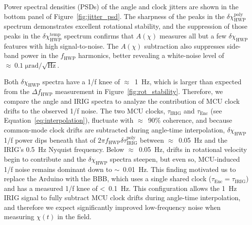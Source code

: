 Power spectral densities (PSDs) of the angle and clock jitters are shown in the bottom panel of Figure~\ref{fig:jitter_psd}. The sharpness of the peaks in the $\delta \chi_{\mathrm{HWP}}^{\mathrm{poly}}$ spectrum demonstrates excellent rotational stability, and the suppression of those peaks in the $\delta \chi_{\mathrm{HWP}}^{\mathrm{temp}}$ spectrum confirms that $A(\chi)$ measures all but a few $\delta \chi_{\mathrm{HWP}}$ features with high signal-to-noise. The $A(\chi)$ subtraction also suppresses side-band power in the $f_{\mathrm{HWP}}$ harmonics, better revealing a white-noise level of $\approx \: 0.1 \; \mathrm{\mu rad / \sqrt{Hz}}$.

Both $\delta \chi_{\mathrm{HWP}}$ spectra have a 1/f knee of $\approx$~1~Hz, which is larger than expected from the $\Delta f_{\mathrm{HWP}}$ measurement in Figure~\ref{fig:rot_stability}. Therefore, we compare the angle and IRIG spectra to analyze the contribution of MCU clock drifts to the observed 1/f noise. The two MCU clocks, $\tau_{\mathrm{IRIG}}$ and $\tau_{\mathrm{Enc}}$ (see Equation~\ref{eq:interpolation}), fluctuate with $\approx$~90\% coherence, and because common-mode clock drifts are subtracted during angle-time interpolation, $\delta \chi_{\mathrm{HWP}}$ 1/f power dips beneath that of $2 \pi f_{\mathrm{HWP}} \delta \tau_{\mathrm{IRIG}}^{\mathrm{poly}}$ between $\approx$~0.05~Hz and the IRIG's 0.5~Hz Nyquist frequency. Below $\approx$~0.05~Hz, drifts in rotational velocity begin to contribute and the $\delta \chi_{\mathrm{HWP}}$ spectra steepen, but even so, MCU-induced 1/f noise remains dominant down to $\sim$~0.01~Hz. This finding  motivated us to replace the Arduino with the BBB, which uses a single shared clock ($\tau_{\mathrm{Enc}} = \tau_{\mathrm{IRIG}}$) and has a measured 1/f knee of <~0.1~Hz. This configuration allows the 1~Hz IRIG signal to fully subtract MCU clock drifts during angle-time interpolation, and therefore we expect significantly improved low-frequency noise when measuring $\chi(t)$ in the field.

